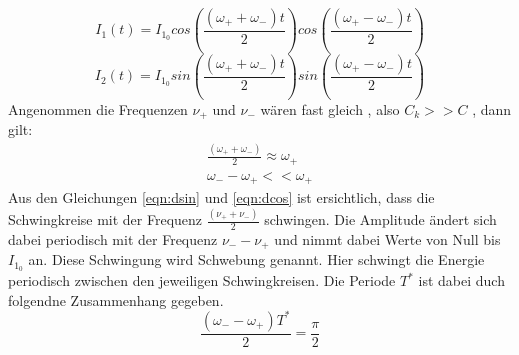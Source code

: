   \begin{equation}
    I_1 (t) = I_{1_0} cos \left( \frac{(\omega_+ + \omega_-)t}{2}\right) cos \left( \frac{(\omega_+ - \omega_-)t}{2}\right)
  \label{eqn:dcos}
  \end{equation}
  \begin{equation}
    I_2 (t) = I_{1_0} sin \left( \frac{(\omega_+ + \omega_-)t}{2}\right) sin \left( \frac{(\omega_+ - \omega_-)t}{2}\right)
  \label{eqn:dsin}
  \end{equation}
  Angenommen die Frequenzen $ \nu_+$ und $ \nu_-$ wären fast gleich , also $ C_k >> C $ , dann gilt:
  \begin{align}
    \frac{\left(\omega_+ + \omega_- \right)}{2} \approx \omega_+ \\
     \omega_- - \omega_+  << \omega_+
  \end{align}
  Aus den Gleichungen \eqref{eqn:dsin} und \eqref{eqn:dcos} ist ersichtlich, dass die Schwingkreise mit der Frequenz $\frac{(\nu_+ + \nu_-)}{2}$ schwingen. Die Amplitude ändert sich
  dabei periodisch mit der Frequenz $ \nu_- - \nu_+$ und nimmt dabei Werte von Null bis $ I_{1_0}$ an. Diese Schwingung wird Schwebung genannt. Hier schwingt die Energie periodisch zwischen
  den jeweiligen Schwingkreisen. Die Periode $T^*$ ist dabei duch folgendne Zusammenhang gegeben.
  \begin{equation}
      \frac{(\omega_- - \omega_+)T^*}{2} = \frac{\pi}{2}
  \end{equation}



